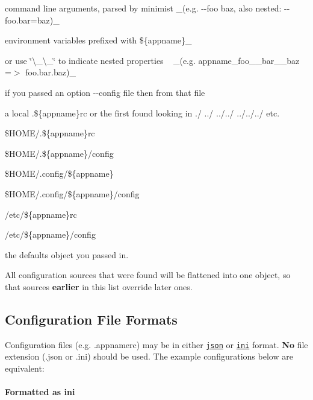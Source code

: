 \begin{DoxyItemize}
\item command line arguments, parsed by minimist \+\_\+(e.\+g. {\ttfamily -\/-\/foo baz}, also nested\+: {\ttfamily -\/-\/foo.\+bar=baz})\+\_\+
\item environment variables prefixed with {\ttfamily \$\{appname\}\+\_\+}
\begin{DoxyItemize}
\item or use \char`\"{}\textbackslash{}\+\_\+\textbackslash{}\+\_\+\char`\"{} to indicate nested properties ~\newline
 \+\_\+(e.\+g. {\ttfamily appname\+\_\+foo\+\_\+\+\_\+bar\+\_\+\+\_\+baz} =$>$ {\ttfamily foo.\+bar.\+baz})\+\_\+
\end{DoxyItemize}
\item if you passed an option {\ttfamily -\/-\/config file} then from that file
\item a local {\ttfamily .\$\{appname\}rc} or the first found looking in {\ttfamily ./ ../ ../../ ../../../} etc.
\item {\ttfamily \$\+H\+O\+ME/.\$\{appname\}rc}
\item {\ttfamily \$\+H\+O\+ME/.\$\{appname\}/config}
\item {\ttfamily \$\+H\+O\+ME/.config/\$\{appname\}}
\item {\ttfamily \$\+H\+O\+ME/.config/\$\{appname\}/config}
\item {\ttfamily /etc/\$\{appname\}rc}
\item {\ttfamily /etc/\$\{appname\}/config}
\item the defaults object you passed in.
\end{DoxyItemize}

All configuration sources that were found will be flattened into one object, so that sources {\bfseries earlier} in this list override later ones.

\subsection*{Configuration File Formats}

Configuration files (e.\+g. {\ttfamily .appnamerc}) may be in either \href{http://json.org/example}{\tt json} or \href{http://en.wikipedia.org/wiki/INI_file}{\tt ini} format. {\bfseries No} file extension ({\ttfamily .json} or {\ttfamily .ini}) should be used. The example configurations below are equivalent\+:

\paragraph*{Formatted as {\ttfamily ini}}


